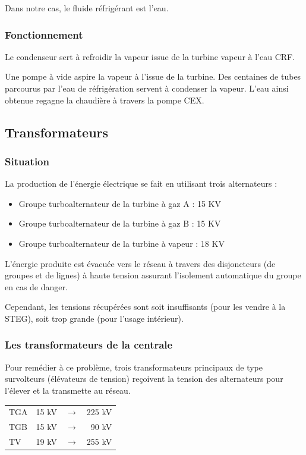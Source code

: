 Dans notre cas, le fluide réfrigérant est  l'eau. 


\subsubsection{Fonctionnement}
Le condenseur sert à refroidir la vapeur issue de la turbine vapeur à l'eau CRF.

Une pompe  à vide aspire la vapeur à l'issue de la turbine.
Des centaines de tubes parcourus par l'eau de réfrigération servent à condenser la vapeur.
L'eau ainsi obtenue regagne la chaudière à travers la pompe CEX.
 
\subsection{Transformateurs}
\subsubsection{Situation}
La production de l'énergie électrique se fait en utilisant trois alternateurs :

\begin{itemize}
\item Groupe turboalternateur de la turbine à gaz A  : 15 KV
\item Groupe turboalternateur de la turbine à gaz B  : 15 KV
\item Groupe turboalternateur de la turbine à vapeur : 18 KV
\end{itemize}

   L'énergie  produite  est  évacuée  vers  le  réseau  à  travers  des  disjoncteurs (de groupes et de lignes)  à  haute tension assurant l'isolement automatique du groupe en cas de danger.
  

Cependant, les tensions récupérées sont soit insuffisants (pour les vendre à la STEG), soit trop grande (pour l'usage intérieur).

\subsubsection{Les transformateurs de la centrale}

Pour remédier à ce problème, trois transformateurs principaux de type survolteurs (élévateurs de tension) reçoivent la tension des alternateurs pour l'élever et la transmette au réseau.

\begin{center}
\begin{tabular}{ l l c r}
TGA &15 kV & $\longrightarrow $& 225 kV\\
TGB &15 kV &$\longrightarrow $& 90 kV\\
TV &19 kV &$\longrightarrow $& 255 kV \\
\end{tabular}
\end{center}

